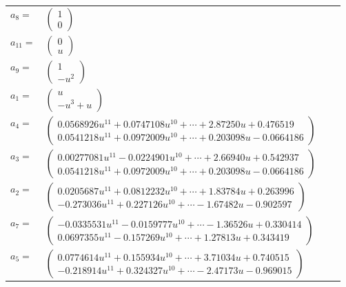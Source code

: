 \documentclass[1p]{elsarticle_modified}
\theoremstyle{definition}
\begin{document}
\begin{tabular}{m{7pt} m{180pt} m{7pt} m{180pt} }
\flushright $a_{8}=$&$\begin{pmatrix}1\\0\end{pmatrix}$ \\
\flushright $a_{11}=$&$\begin{pmatrix}0\\u\end{pmatrix}$ \\
\flushright $a_{9}=$&$\begin{pmatrix}1\\- u^2\end{pmatrix}$ \\
\flushright $a_{1}=$&$\begin{pmatrix}u\\- u^3+u\end{pmatrix}$ \\
\flushright $a_{4}=$&$\begin{pmatrix}0.0568926 u^{11}+0.0747108 u^{10}+\cdots+2.87250 u+0.476519\\0.0541218 u^{11}+0.0972009 u^{10}+\cdots+0.203098 u-0.0664186\end{pmatrix}$ \\
\flushright $a_{3}=$&$\begin{pmatrix}0.00277081 u^{11}-0.0224901 u^{10}+\cdots+2.66940 u+0.542937\\0.0541218 u^{11}+0.0972009 u^{10}+\cdots+0.203098 u-0.0664186\end{pmatrix}$ \\
\flushright $a_{2}=$&$\begin{pmatrix}0.0205687 u^{11}+0.0812232 u^{10}+\cdots+1.83784 u+0.263996\\-0.273036 u^{11}+0.227126 u^{10}+\cdots-1.67482 u-0.902597\end{pmatrix}$ \\
\flushright $a_{7}=$&$\begin{pmatrix}-0.0335531 u^{11}-0.0159777 u^{10}+\cdots-1.36526 u+0.330414\\0.0697355 u^{11}-0.157269 u^{10}+\cdots+1.27813 u+0.343419\end{pmatrix}$ \\
\flushright $a_{5}=$&$\begin{pmatrix}0.0774614 u^{11}+0.155934 u^{10}+\cdots+3.71034 u+0.740515\\-0.218914 u^{11}+0.324327 u^{10}+\cdots-2.47173 u-0.969015\end{pmatrix}$ \\

\end{tabular}
\end{document}
